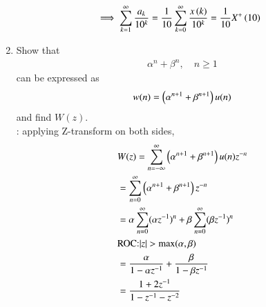 \documentclass[journal,12pt,twocolumn]{IEEEtran}
\renewcommand\thesection{\arabic{section}}
\begin{document}
\begin{enumerate}[label=\thesection.\arabic*,ref=\thesection.\theenumi]
\begin{align}
	&\implies \sum_{k=1}^{\infty}\frac{a_k}{10^k}= 
	\frac{1}{10}\sum_{k=0}^{\infty}\frac{x\left(k\right)}{10^k} =\frac{1}{10}X^{+}\left({10}\right)
\end{align}
 \item Show that 
\begin{align}
	\alpha^n + \beta^n, \quad n \ge 1
\end{align}
can be expressed as 
\begin{align}
	w(n) =\left(\alpha^{n+1} + \beta^{n+1}\right)u(n)
\end{align}
		and find $W(z)$.\\
		\solution:
applying Z-transform on both sides,
\begin{align}
	&W(z)=\sum_{n=-\infty}^{\infty}\brak{\alpha^{n+1} + \beta^{n+1}}u(n)z^{-n}\\
	&=\sum_{n=0}^{\infty}\brak{\alpha^{n+1} + \beta^{n+1}}z^{-n}\\
	&=\alpha \sum_{n=0}^{\infty}(\alpha z^{-1})^{n}+\beta \sum_{n=0}^{\infty} (\beta z^{-1})^{n}\\
	&\text{ROC:} |z|>\text{max}(\alpha,\beta)\\
	&=\frac{\alpha}{1-\alpha z^{-1}}+\frac{\beta}{1-\beta z^{-1}}\\
	&=\frac{1+2z^{-1}}{1-z^{-1}-z^{-2}}
\end{align}


\end{enumerate}
\end{document}
